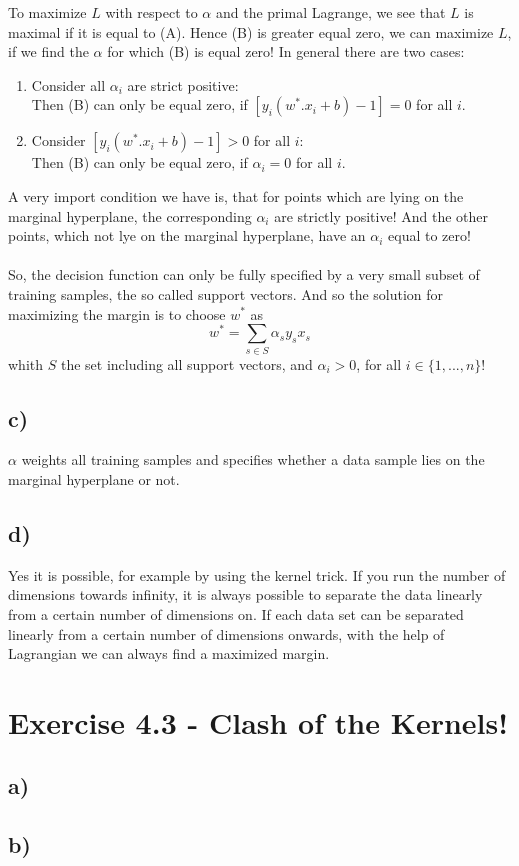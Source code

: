 \documentclass[a4paper]{article}
\begin{document}
        To maximize $L$ with respect to $\alpha$ and the primal Lagrange, we see that $L$ is maximal if it is equal to (A).
        Hence (B) is greater equal zero, we can maximize $L$, if we find the $\alpha$ for which (B) is equal zero!
        In general there are two cases:
        \begin{enumerate}
            \item Consider all $\alpha_i$ are strict positive:\\
                Then (B) can only be equal zero, if $[y_i (w^*.x_i + b) - 1] = 0$ for all $i$.
            \item Consider $[y_i (w^*.x_i + b) - 1] > 0$ for all $i$:\\
                Then (B) can only be equal zero, if $\alpha_i = 0$ for all $i$.
        \end{enumerate}
        A very import condition we have is, that for points which are lying on the marginal hyperplane, the corresponding $\alpha_i$ are strictly positive!
        And the other points, which not lye on the marginal hyperplane, have an $\alpha_i$ equal to zero!\\\\
        So, the decision function can only be fully specified by a very small subset of training samples, the so called support vectors.
        And so the solution for maximizing the margin is to choose $w^*$ as
        $$w^* = \sum\limits_{s \in S} \alpha_s y_s x_s$$
        whith $S$ the set including all support vectors, and $\alpha_i > 0$, for all $i \in \{1,...,n\}$!

    
    \subsection*{c)}
        $\alpha$ weights all training samples and specifies whether a data sample lies on the marginal hyperplane or not.
    
    \subsection*{d)}
        Yes it is possible, for example by using the kernel trick.
        If you run the number of dimensions towards infinity, it is always possible to separate the data linearly from a certain number of dimensions on.
        If each data set can be separated linearly from a certain number of dimensions onwards, with the help of Lagrangian we can always find a maximized margin.



\section*{Exercise 4.3 - Clash of the Kernels!}
    \subsection*{a)}
    
    \subsection*{b)}
    
\end{document}
